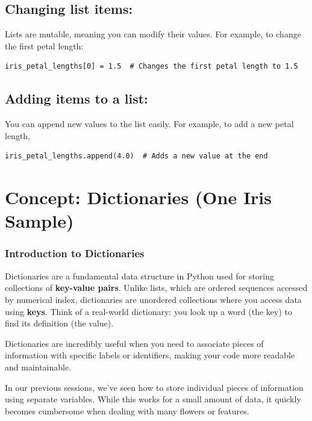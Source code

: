 \subsection{Changing list items:} 
Lists are mutable, meaning you can modify their values. For example, to change the first petal length:
\begin{verbatim}
iris_petal_lengths[0] = 1.5  # Changes the first petal length to 1.5
\end{verbatim}

\subsection{Adding items to a list:} 
You can append new values to the list easily. For example, to add a new petal length,
\begin{verbatim}
iris_petal_lengths.append(4.0)  # Adds a new value at the end
\end{verbatim}


\section{Concept: Dictionaries (One Iris Sample)}
\label{sec:dictionaries}

\subsubsection{Introduction to Dictionaries}
\label{sec:ses3_dictionaries}

Dictionaries are a fundamental data structure in Python used for storing collections of \textbf{key-value pairs}. Unlike lists, which are ordered sequences accessed by numerical index, dictionaries are unordered collections where you access data using \textbf{keys}. Think of a real-world dictionary: you look up a word (the key) to find its definition (the value).

Dictionaries are incredibly useful when you need to associate pieces of information with specific labels or identifiers, making your code more readable and maintainable.

In our previous sessions, we've seen how to store individual pieces of information using separate variables. While this works for a small amount of data, it quickly becomes cumbersome when dealing with many flowers or features.

